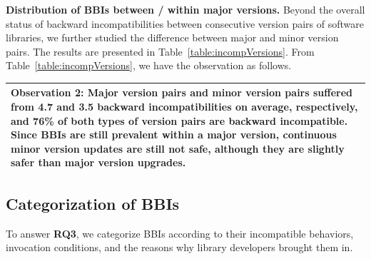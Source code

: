 %


\textbf{Distribution of BBIs between / within major versions.} Beyond the overall status of backward incompatibilities between consecutive version pairs of software libraries, we further studied the difference between major and minor version pairs. The results are presented in Table~\ref{table:incompVersions}.
From Table~\ref{table:incompVersions}, we have the observation as follows. 

\medskip\vspace{+0.05cm}
\noindent\begin{tabular}{|p{16cm}|}
	\hline
	\textbf{Observation 2:} Major version pairs and minor version pairs suffered from 4.7 and 3.5 backward incompatibilities on average, respectively, and 76\% of both types of version pairs 
	are backward incompatible. Since BBIs are still prevalent within a major version, continuous minor version updates are still not safe, although they are slightly safer than major version upgrades. \\
	\hline
\end{tabular}
\medskip\vspace{+0.05cm}






\subsection{Categorization of BBIs}
\label{subsec:cats}

To answer \textbf{RQ3}, we categorize BBIs according to their incompatible behaviors, invocation conditions, and the reasons why library developers brought them in. 

